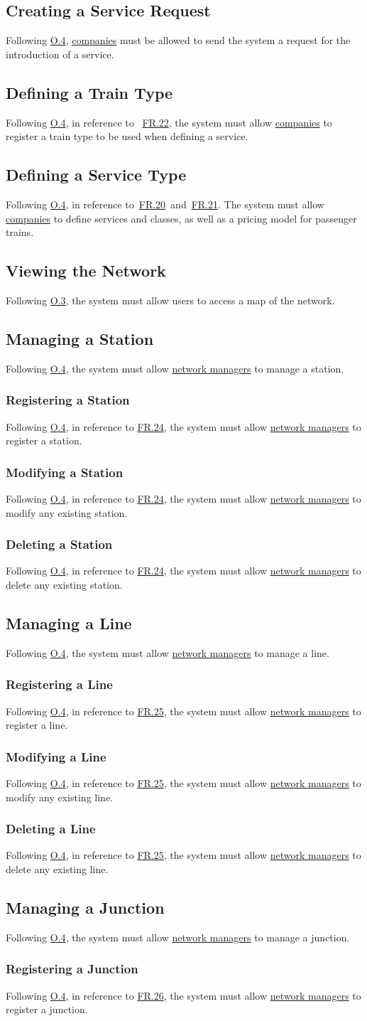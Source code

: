 \documentclass[12pt]{article}
\newcommand\un[1]{\underline{#1}}
\newcommand\hyl[1]{\hyperref[#1]{#1}}
\newcommand\subs[2]{\subsection{#1}\label{#2}}
\newcommand\ssubs[2]{\subsubsection{#1}\label{#2}}
\begin{document}
\subs{Creating a Service Request}{FR.20}
Following \hyl{O.4}, \un{companies} must be allowed to send the system a request for the introduction of a service.

\subs{Defining a Train Type}{FR.21}
Following \hyl{O.4}, in reference to  \hyl{FR.22}, the system must allow \un{companies} to register a train type to be used when defining a service.

\subs{Defining a Service Type}{FR.22}
Following \hyl{O.4}, in reference to \hyl{FR.20} and \hyl{FR.21}.  
The system must allow \un{companies} to define services and classes, as well as a pricing model for passenger trains.

\subs{Viewing the Network}{FR.23}
Following \hyl{O.3}, the system must allow users to access a map of the network.

\subs{Managing a Station}{FR.24}
Following \hyl{O.4}, the system must allow \un{network managers} to manage a station.

\ssubs{Registering a Station}{FR.24.1}
Following \hyl{O.4}, in reference to \hyl{FR.24}, the system must allow \un{network managers} to register a station.

\ssubs{Modifying a Station}{FR.24.2}
Following \hyl{O.4}, in reference to \hyl{FR.24}, the system must allow \un{network managers} to modify any existing station.

\ssubs{Deleting a Station}{FR.24.3}
Following \hyl{O.4}, in reference to \hyl{FR.24}, the system must allow \un{network managers} to delete any existing station.

\subs{Managing a Line}{FR.25}
Following \hyl{O.4}, the system must allow \un{network managers} to manage a line.

\ssubs{Registering a Line}{FR.25.1}
Following \hyl{O.4}, in reference to \hyl{FR.25}, the system must allow \un{network managers} to register a line.  

\ssubs{Modifying a Line}{FR.25.2}
Following \hyl{O.4}, in reference to \hyl{FR.25}, the system must allow \un{network managers} to modify any existing line.  

\ssubs{Deleting a Line}{FR.25.3}
Following \hyl{O.4}, in reference to \hyl{FR.25}, the system must allow \un{network managers} to delete any existing line.

\subs{Managing a Junction}{FR.26}
Following \hyl{O.4}, the system must allow \un{network managers} to manage a junction.

\ssubs{Registering a Junction}{FR.26.1}
Following \hyl{O.4}, in reference to \hyl{FR.26}, the system must allow \un{network managers} to register a junction.  
\end{document}
